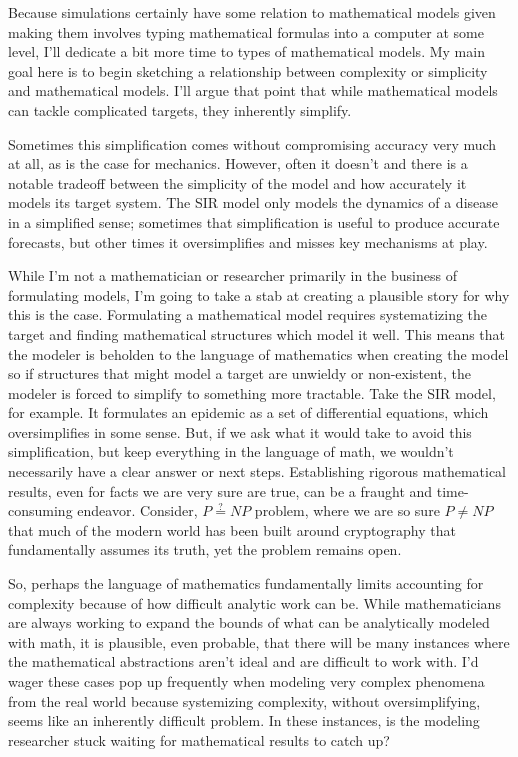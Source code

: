 Because simulations certainly have some relation to mathematical models
given making them involves typing mathematical formulas into a computer
at some level, I'll dedicate a bit more time to types of mathematical
models. My main goal here is to begin sketching a relationship between
complexity or simplicity and mathematical models. I'll argue that point
that while mathematical models can tackle complicated targets, they
inherently simplify.

Sometimes this simplification comes without compromising accuracy very
much at all, as is the case for mechanics. However, often it doesn't and
there is a notable tradeoff between the simplicity of the model and how
accurately it models its target system. The SIR model only models the
dynamics of a disease in a simplified sense; sometimes that
simplification is useful to produce accurate forecasts, but other times
it oversimplifies and misses key mechanisms at play.

While I'm not a mathematician or researcher primarily in the business of
formulating models, I'm going to take a stab at creating a plausible
story for why this is the case. Formulating a mathematical model
requires systematizing the target and finding mathematical structures
which model it well. This means that the modeler is beholden to the
language of mathematics when creating the model so if structures that
might model a target are unwieldy or non-existent, the modeler is forced
to simplify to something more tractable. Take the SIR model, for
example. It formulates an epidemic as a set of differential equations,
which oversimplifies in some sense. But, if we ask what it would take to
avoid this simplification, but keep everything in the language of math,
we wouldn't necessarily have a clear answer or next steps. Establishing
rigorous mathematical results, even for facts we are very sure are true,
can be a fraught and time-consuming endeavor. Consider,
\(P \stackrel{?}{=} NP\) problem, where we are so sure \(P \neq NP\)
that much of the modern world has been built around cryptography that
fundamentally assumes its truth, yet the problem remains open.

So, perhaps the language of mathematics fundamentally limits accounting
for complexity because of how difficult analytic work can be. While
mathematicians are always working to expand the bounds of what can be
analytically modeled with math, it is plausible, even probable, that
there will be many instances where the mathematical abstractions aren't
ideal and are difficult to work with. I'd wager these cases pop up
frequently when modeling very complex phenomena from the real world
because systemizing complexity, without oversimplifying, seems like an
inherently difficult problem. In these instances, is the modeling
researcher stuck waiting for mathematical results to catch up?

